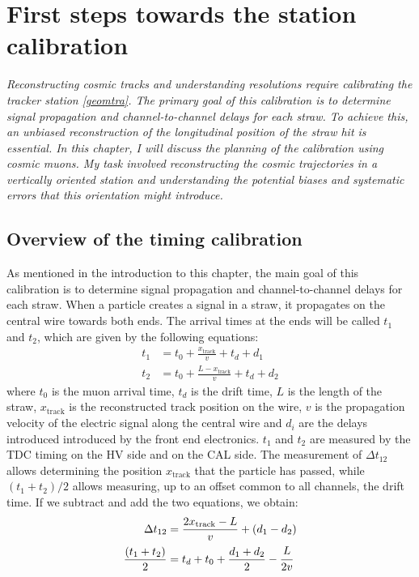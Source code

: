 \chapter{First steps towards the station calibration}\label{planning}
\textit{Reconstructing cosmic tracks and understanding resolutions require 
calibrating the tracker station \ref{geomtra}. 
The primary goal of this calibration is to determine signal propagation and 
channel-to-channel delays for each straw. To achieve this, an unbiased 
reconstruction of the longitudinal position of the straw 
hit is essential. In this chapter, I will discuss the planning 
of the calibration using cosmic muons. My task 
involved reconstructing the cosmic trajectories in a vertically 
oriented station and understanding the potential 
biases and systematic errors that this orientation might introduce.}
\section{Overview of the timing calibration}
As mentioned in the introduction to this chapter, the main 
goal of this calibration is to determine signal propagation 
and channel-to-channel delays for each straw.
When a particle creates a signal in a straw, it propagates 
on the central wire towards both ends. 
The arrival times at the ends will be called $t_1$ and $t_2$, 
which are given by the following equations:
\begin{equation}
\begin{aligned}
    t_1 &= t_0 + \frac{x_{\text{track}}}{v} + t_d + d_1 \\
    t_2 &= t_0 + \frac{L - x_{\text{track}}}{v} + t_d + d_2
\end{aligned}
\end{equation}
where $t_0$ is the muon arrival time, $t_d$ is the drift time, 
$L$ is the length of the straw, $x_{\text{track}}$ is the 
reconstructed track position on the wire, $v$ 
is the propagation velocity of the electric signal along the central 
wire and $d_i$ are the delays introduced 
introduced by the front end electronics. 
$t_1$ and $t_2$ are measured  
by the TDC timing on the HV side and on the CAL side.
The measurement of $\Delta t_{12}$ allows 
determining the position $x_{\text{track}}$ that 
the particle has passed, 
while $(t_1 + t_2) / 2$ allows measuring, 
up to an offset common to all channels, the drift time. 
If we subtract and add the two equations, we obtain:
\begin{equation}\label{ffffff}
    \begin{aligned}
        \Delta t_{12} &= \frac{2x_{\text{track}}-L}{v} +(d_1-d_2)  \\
        \frac{(t_1 + t_2)}{2} &= t_d+t_0+\frac{d_1+d_2}{2}-\cfrac{L}{2v} 
    \end{aligned}
    \end{equation}
